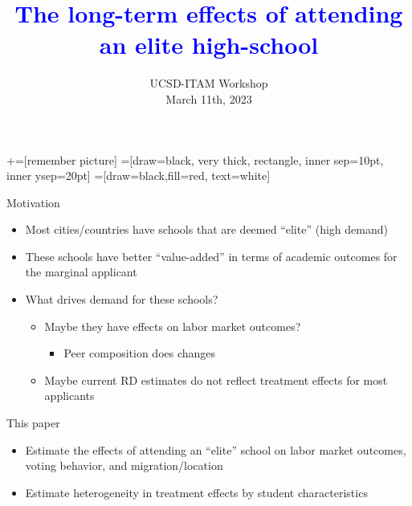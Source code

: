 \documentclass[notes,11pt, aspectratio=169]{beamer}
\title[]{\textcolor{blue}{The long-term effects of attending an elite high-school}}
\author[Marco Medina]{}
\institute[FRBNY]{\small{\begin{tabular}{c c c c c}
Mauricio Romero &&  Enrique Seira && Rafael de Hoyos   \\
ITAM && ITAM/MSU && World Bank \\ \\

\end{tabular}}}
\date{UCSD-ITAM Workshop \\ March 11th, 2023}
\begin{document}
\newcommand\marktopleft[1]{%
    \tikz[overlay,remember picture] 
        \node (marker-#1-a) at (-.3em,.3em) {};%
}
\newcommand\markbottomright[2]{%
    \tikz[overlay,remember picture] 
        \node (marker-#1-b) at (0em,0em) {};%
}
+=[remember picture] 
 =[draw=black, very thick, rectangle, inner sep=10pt, inner ysep=20pt]
 =[draw=black,fill=red, text=white]

\begin{frame}
\maketitle
\end{frame}

\begin{frame}[fragile]{Motivation}
  \begin{itemize}[<+->]
    \vfill\item Most cities/countries have schools that are deemed ``elite'' (high demand)
    \vfill\item These schools  have better ``value-added'' in terms of academic outcomes for the marginal applicant \tiny{\citep{Adrienne2014,ElliteIllusion,DobbieFryer2014,dustan2017flourish,ParentsValueEffectiveness}}
\vfill\item What drives demand for these schools?
  \begin{itemize}
    \vfill\item Maybe they have effects on labor market outcomes?
      \begin{itemize}
     \vfill\item Peer composition does changes \tiny{\citep{ElliteIllusion,DobbieFryer2014,ParentsValueEffectiveness}}
       \end{itemize}
    \vfill\item Maybe current RD estimates do not reflect treatment effects for most applicants
  \end{itemize}
    \end{itemize}
\end{frame}

\begin{frame}[fragile]{This paper}
  \begin{itemize}
    \vfill\item Estimate the effects of attending an ``elite'' school on labor market outcomes, voting behavior, and migration/location
    \vfill\item Estimate heterogeneity in treatment effects by student characteristics
    \end{itemize}
\end{frame}
\end{document}

